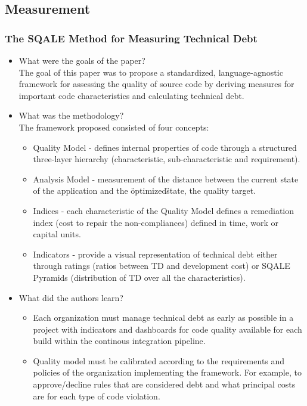 \documentclass{mprop}
\begin{document}
\subsection{Measurement}

\subsubsection{The SQALE Method for Measuring Technical Debt} \cite{Letouzey2012}

\begin{itemize}
	\item What were the goals of the paper? \\
	      The goal of this paper was to propose a standardized, language-agnostic framework for assessing the quality of source code by deriving measures for important code characteristics and calculating technical debt.
	\item What was the methodology? \\
	      The framework proposed consisted of four concepts:
	      \begin{itemize}
		      \item Quality Model - defines internal properties of code through a structured three-layer hierarchy (characteristic, sub-characteristic and requirement).
		      \item Analysis Model - measurement of the distance between the current state of the application and the \"optimized\" state, the quality target.
		      \item Indices - each characteristic of the Quality Model defines a remediation index (cost to repair the non-compliances) defined in time, work or capital units.
		      \item Indicators - provide a visual representation of technical debt either through ratings (ratios between TD and development cost) or SQALE Pyramids (distribution of TD over all the characteristics).
	      \end{itemize}
	\item What did the authors learn?
	      \begin{itemize}
		      \item Each organization must manage technical debt as early as possible in a project with indicators and dashboards for code quality available for each build within the continous integration pipeline.
		      \item Quality model must be calibrated according to the requirements and policies of the organization implementing the framework. For example, to approve/decline rules that are considered debt and what principal costs are for each type of code violation.

\end{itemize}
\end{itemize}
\end{document}
